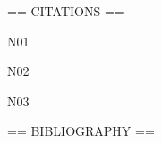 \documentclass[paper={1500mm,1000mm},line_length=1450mm,number_of_lines=150]{jlreq}
\newcommand*{\case}[2]{#1 #2\par}
\begin{document}
\raggedright
== CITATIONS ==\par
\case{N01}{\textcite{Inagami1981}}
\case{N02}{\parencite{Abbott1995}}
\case{N03}{\parencite{SatoY1998}}
== BIBLIOGRAPHY ==\par
\nocite{Abbott1995,Inagami1981,SatoY1998}
\printbibliography[heading=none]
\end{document}
